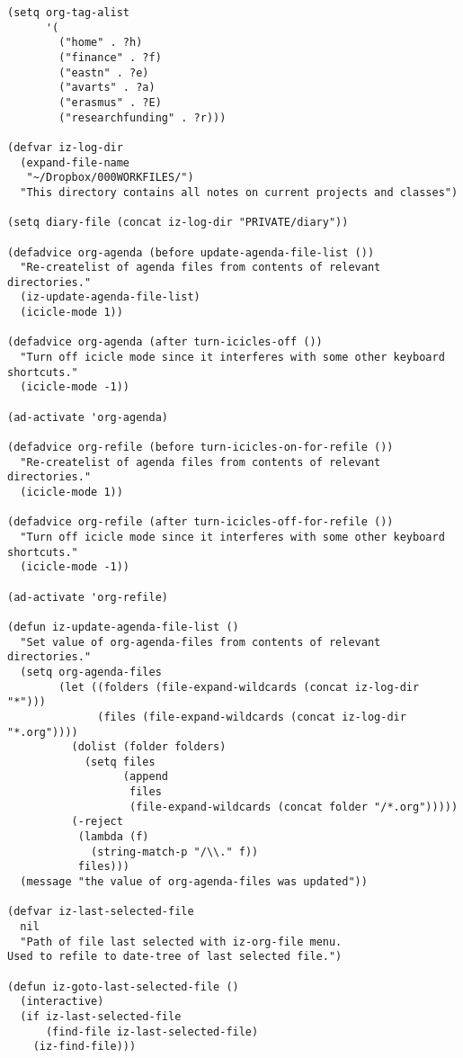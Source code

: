 \documentclass[10pt]{article}
\begin{document}
\begin{verbatim}
(setq org-tag-alist
      '(
        ("home" . ?h)
        ("finance" . ?f)
        ("eastn" . ?e)
        ("avarts" . ?a)
        ("erasmus" . ?E)
        ("researchfunding" . ?r)))

(defvar iz-log-dir
  (expand-file-name
   "~/Dropbox/000WORKFILES/")
  "This directory contains all notes on current projects and classes")

(setq diary-file (concat iz-log-dir "PRIVATE/diary"))

(defadvice org-agenda (before update-agenda-file-list ())
  "Re-createlist of agenda files from contents of relevant directories."
  (iz-update-agenda-file-list)
  (icicle-mode 1))

(defadvice org-agenda (after turn-icicles-off ())
  "Turn off icicle mode since it interferes with some other keyboard shortcuts."
  (icicle-mode -1))

(ad-activate 'org-agenda)

(defadvice org-refile (before turn-icicles-on-for-refile ())
  "Re-createlist of agenda files from contents of relevant directories."
  (icicle-mode 1))

(defadvice org-refile (after turn-icicles-off-for-refile ())
  "Turn off icicle mode since it interferes with some other keyboard shortcuts."
  (icicle-mode -1))

(ad-activate 'org-refile)

(defun iz-update-agenda-file-list ()
  "Set value of org-agenda-files from contents of relevant directories."
  (setq org-agenda-files
        (let ((folders (file-expand-wildcards (concat iz-log-dir "*")))
              (files (file-expand-wildcards (concat iz-log-dir "*.org"))))
          (dolist (folder folders)
            (setq files
                  (append
                   files
                   (file-expand-wildcards (concat folder "/*.org")))))
          (-reject
           (lambda (f)
             (string-match-p "/\\." f))
           files)))
  (message "the value of org-agenda-files was updated"))

(defvar iz-last-selected-file
  nil
  "Path of file last selected with iz-org-file menu.
Used to refile to date-tree of last selected file.")

(defun iz-goto-last-selected-file ()
  (interactive)
  (if iz-last-selected-file
      (find-file iz-last-selected-file)
    (iz-find-file)))


\end{verbatim}
\end{document}

